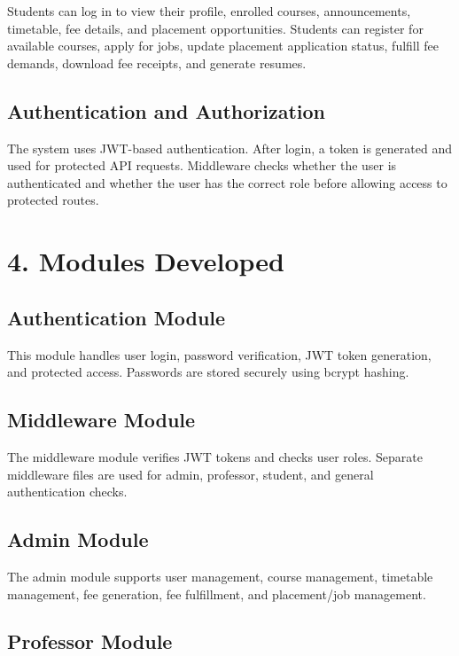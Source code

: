 \documentclass[12pt]{article}
\begin{document}
Students can log in to view their profile, enrolled courses, announcements, timetable, fee details, and placement opportunities. Students can register for available courses, apply for jobs, update placement application status, fulfill fee demands, download fee receipts, and generate resumes.

\subsection*{Authentication and Authorization}

The system uses JWT-based authentication. After login, a token is generated and used for protected API requests. Middleware checks whether the user is authenticated and whether the user has the correct role before allowing access to protected routes.

\section*{4. Modules Developed}

\subsection*{Authentication Module}

This module handles user login, password verification, JWT token generation, and protected access. Passwords are stored securely using bcrypt hashing.

\subsection*{Middleware Module}

The middleware module verifies JWT tokens and checks user roles. Separate middleware files are used for admin, professor, student, and general authentication checks.

\subsection*{Admin Module}

The admin module supports user management, course management, timetable management, fee generation, fee fulfillment, and placement/job management.

\subsection*{Professor Module}
\end{document}

